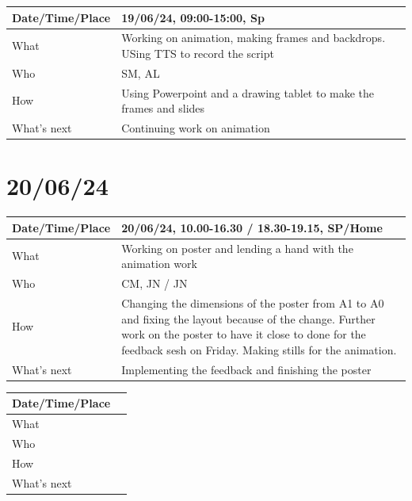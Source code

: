 \documentclass{article}
\begin{document}
\begin{table}[H]
\begin{tabular}{|p{1.5in}|p{4in}|}
\hline
Date/Time/Place & 19/06/24, 09:00-15:00, Sp \\ \hline
What            & Working on animation, making frames and backdrops. USing TTS to record the script \\ \hline
Who             & SM, AL \\ \hline
How             & Using Powerpoint and a drawing tablet to make the frames and slides \\ \hline
What's next     & Continuing work on animation \\ \hline
\end{tabular}
\end{table}

\section{20/06/24}

\begin{table}[H]
\begin{tabular}{|p{1.5in}|p{4in}|}
\hline
Date/Time/Place & 20/06/24, 10.00-16.30 / 18.30-19.15, SP/Home \\ \hline
What            & Working on poster and lending a hand with the animation work \\ \hline
Who             & CM, JN / JN \\ \hline
How             & Changing the dimensions of the poster from A1 to A0 and fixing the layout because of the change. Further work on the poster to have it close to done for the feedback sesh on Friday. Making stills for the animation. \\ \hline
What's next     & Implementing the feedback and finishing the poster \\ \hline
\end{tabular}
\end{table}

\begin{table}[H]
\begin{tabular}{|p{1.5in}|p{4in}|}
\hline
Date/Time/Place &  \\ \hline
What            &  \\ \hline
Who             &  \\ \hline
How             &  \\ \hline
What's next     &  \\ \hline
\end{tabular}
\end{table}
\end{document}
